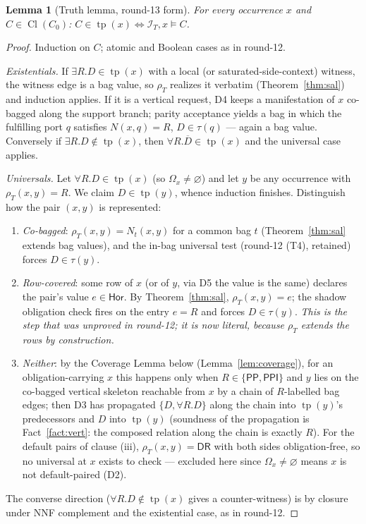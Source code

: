 \documentclass[11pt]{article}
\newtheorem{lemma}[theorem]{Lemma}
\theoremstyle{definition}
\newcommand{\PP}{\mathsf{PP}}
\newcommand{\PPI}{\mathsf{PPI}}
\newcommand{\DR}{\mathsf{DR}}
\newcommand{\Hor}{\mathsf{Hor}}
\newcommand{\Cl}{\operatorname{Cl}}
\newcommand{\tp}{\operatorname{tp}}
\begin{document}
\begin{lemma}[Truth lemma, round-13 form]\label{lem:truth}
For every occurrence $x$ and $C\in\Cl(C_0)$:
$C\in\tp(x)\iff \mathcal I_T,x\models C$.
\end{lemma}

\begin{proof}
Induction on $C$; atomic and Boolean cases as in round-12.

\emph{Existentials.}  If $\exists R.D\in\tp(x)$ with a local (or
saturated-side-context) witness, the witness edge is a bag value, so
$\rho_T$ realizes it verbatim (Theorem~\ref{thm:sal}) and induction
applies.  If it is a vertical request, D4 keeps a manifestation of $x$
co-bagged along the support branch; parity acceptance yields a bag in
which the fulfilling port $q$ satisfies $N(x,q)=R$, $D\in\tau(q)$ ---
again a bag value.  Conversely if $\exists R.D\notin\tp(x)$, then
$\forall R.\overline D\in\tp(x)$ and the universal case applies.

\emph{Universals.}  Let $\forall R.D\in\tp(x)$ (so
$\Omega_x\neq\varnothing$) and let $y$ be any occurrence with
$\rho_T(x,y)=R$.  We claim $D\in\tp(y)$, whence induction finishes.
Distinguish how the pair $(x,y)$ is represented:
\begin{enumerate}[label=(\roman*),leftmargin=2.2em]
\item \emph{Co-bagged}: $\rho_T(x,y)=N_t(x,y)$ for a common bag $t$
(Theorem~\ref{thm:sal} extends bag values), and the in-bag universal test
(round-12 (T4), retained) forces $D\in\tau(y)$.
\item \emph{Row-covered}: some row of $x$ (or of $y$, via D5 the value is
the same) declares the pair's value $e\in\Hor$.  By
Theorem~\ref{thm:sal}, $\rho_T(x,y)=e$; the shadow obligation check
fires on the entry $e=R$ and forces $D\in\tau(y)$.  \emph{This is the
step that was unproved in round-12; it is now literal, because $\rho_T$
extends the rows by construction.}
\item \emph{Neither}: by the Coverage Lemma below
(Lemma~\ref{lem:coverage}), for an obligation-carrying $x$ this happens
only when $R\in\{\PP,\PPI\}$ and $y$ lies on the co-bagged vertical
skeleton reachable from $x$ by a chain of $R$-labelled bag edges; then D3
has propagated $\{D,\forall R.D\}$ along the chain into $\tp(y)$'s
predecessors and $D$ into $\tp(y)$ (soundness of the propagation is
Fact~\ref{fact:vert}: the composed relation along the chain is exactly
$R$).  For the default pairs of clause (iii), $\rho_T(x,y)=\DR$ with both
sides obligation-free, so no universal at $x$ exists to check ---
excluded here since $\Omega_x\neq\varnothing$ means $x$ is not
default-paired (D2).
\end{enumerate}
The converse direction ($\forall R.D\notin\tp(x)$ gives a counter-witness)
is by closure under NNF complement and the existential case, as in
round-12.
\end{proof}
\end{document}
